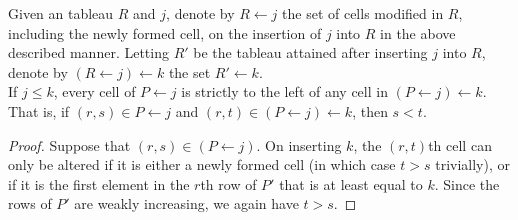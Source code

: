 	\begin{flem}
		Given an tableau $R$ and $j$, denote by $R \leftarrow j$ the set of cells modified in $R$, including the newly formed cell, on the insertion of $j$ into $R$ in the above described manner. Letting $R'$ be the tableau attained after inserting $j$ into $R$, denote by $(R \leftarrow j) \leftarrow k$ the set $R' \leftarrow k$.\\
		If $j \le k$, every cell of $P \leftarrow j$ is strictly to the left of any cell in $(P \leftarrow j) \leftarrow k$. That is, if $(r,s) \in P\leftarrow j$ and $(r,t) \in (P \leftarrow j) \leftarrow k$, then $s < t$.
	\end{flem}
	\begin{proof}
		Suppose that $(r,s) \in (P \leftarrow j)$. On inserting $k$, the $(r,t)$th cell can only be altered if it is either a newly formed cell (in which case $t>s$ trivially), or if it is the first element in the $r$th row of $P'$ that is at least equal to $k$. Since the rows of $P'$ are weakly increasing, we again have $t>s$.
	\end{proof}



